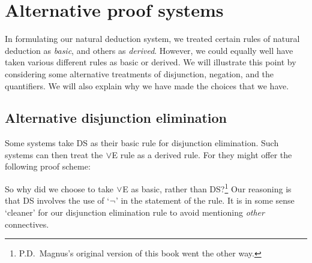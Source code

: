 
\chapter{Alternative proof systems}
In formulating our natural deduction system, we treated certain rules of natural deduction as \emph{basic}, and others as \emph{derived}. However, we could equally well have taken various different rules as basic or derived. We will illustrate this point by considering some alternative treatments of disjunction, negation, and the quantifiers. We will also explain why we have made the choices that we have.


\section{Alternative disjunction elimination}
Some systems take DS as their basic rule for disjunction elimination. Such systems can then treat the $\vee$E rule as a derived rule. For they might offer the following proof scheme: 
\begin{fitchproof}
  \open
     {}
  \close
  \open
  \close
  \open
    \open
    \close
  \close
\end{fitchproof}
So why did we choose to take $\vee$E as basic, rather than DS?\footnote{P.D.\ Magnus's original version of this book went the other way.} Our reasoning is that DS involves the use of `$\neg$' in the statement of the rule. It is in some sense `cleaner' for our disjunction elimination rule to avoid mentioning \emph{other} connectives. 


